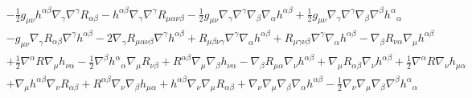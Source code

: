 \documentclass[10pt,letterpaper]{article}
\begin{document}
\begin{align*}
& -  \tfrac{1}{2} g_{\mu \nu} h^{\alpha \beta} \nabla_{\gamma}\nabla^{\gamma}R_{\alpha \beta} -  h^{\alpha \beta} \nabla_{\gamma}\nabla^{\gamma}R_{\mu \alpha \nu \beta} -  \tfrac{1}{2} g_{\mu \nu} \nabla_{\gamma}\nabla^{\gamma}\nabla_{\beta}\nabla_{\alpha}h^{\alpha \beta} + \tfrac{1}{2} g_{\mu \nu} \nabla_{\gamma}\nabla^{\gamma}\nabla_{\beta}\nabla^{\beta}h^{\alpha}{}_{\alpha}\\
& -  g_{\mu \nu} \nabla_{\gamma}R_{\alpha \beta} \nabla^{\gamma}h^{\alpha \beta} - 2 \nabla_{\gamma}R_{\mu \alpha \nu \beta} \nabla^{\gamma}h^{\alpha \beta} + R_{\mu \beta \nu \gamma} \nabla^{\gamma}\nabla_{\alpha}h^{\alpha \beta} + R_{\mu \gamma \nu \beta} \nabla^{\gamma}\nabla_{\alpha}h^{\alpha \beta} -  \nabla_{\beta}R_{\nu \alpha} \nabla_{\mu}h^{\alpha \beta}\\
& + \tfrac{1}{2} \nabla^{\alpha}R \nabla_{\mu}h_{\nu \alpha} -  \tfrac{1}{2} \nabla^{\beta}h^{\alpha}{}_{\alpha} \nabla_{\mu}R_{\nu \beta} + R^{\alpha \beta} \nabla_{\mu}\nabla_{\beta}h_{\nu \alpha} -  \nabla_{\beta}R_{\mu \alpha} \nabla_{\nu}h^{\alpha \beta} + \nabla_{\mu}R_{\alpha \beta} \nabla_{\nu}h^{\alpha \beta} + \tfrac{1}{2} \nabla^{\alpha}R \nabla_{\nu}h_{\mu \alpha} \\
&+ \nabla_{\mu}h^{\alpha \beta} \nabla_{\nu}R_{\alpha \beta}+ R^{\alpha \beta} \nabla_{\nu}\nabla_{\beta}h_{\mu \alpha} + h^{\alpha \beta} \nabla_{\nu}\nabla_{\mu}R_{\alpha \beta} + \nabla_{\nu}\nabla_{\mu}\nabla_{\beta}\nabla_{\alpha}h^{\alpha \beta} -  \tfrac{1}{2} \nabla_{\nu}\nabla_{\mu}\nabla_{\beta}\nabla^{\beta}h^{\alpha}{}_{\alpha}
\end{align*}
\end{document}
